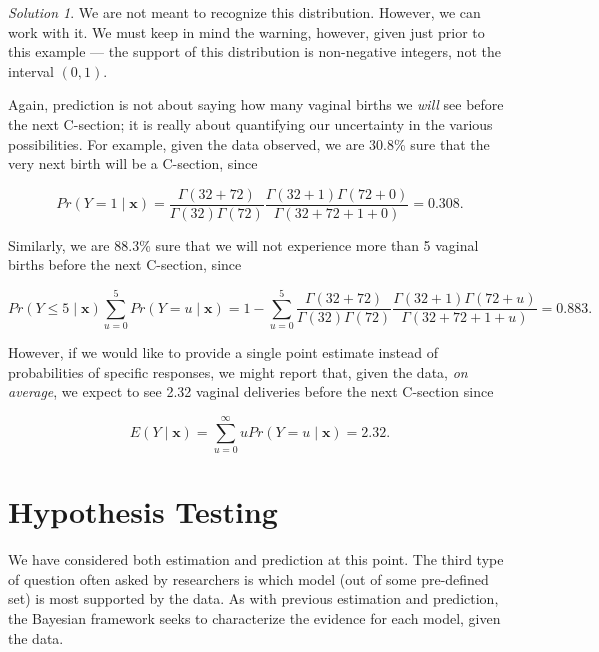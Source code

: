 \documentclass[
  letterpaper,
  DIV=11,
  numbers=noendperiod]{scrreprt}
\theoremstyle{definition}
\theoremstyle{definition}
\theoremstyle{plain}
\theoremstyle{remark}
\newtheorem*{solution}{Solution}
\begin{document}
\begin{solution}
We are not meant to recognize this distribution. However, we can work
with it. We must keep in mind the warning, however, given just prior to
this example --- the support of this distribution is non-negative
integers, not the interval \((0, 1)\).

Again, prediction is not about saying how many vaginal births we
\emph{will} see before the next C-section; it is really about
quantifying our uncertainty in the various possibilities. For example,
given the data observed, we are 30.8\% sure that the very next birth
will be a C-section, since

\[Pr(Y = 1 \mid \mathbf{x}) = \frac{\Gamma(32 + 72)}{\Gamma(32) \Gamma(72)} \frac{\Gamma(32 + 1) \Gamma(72 + 0)}{\Gamma(32 + 72 + 1 + 0)} = 0.308.\]

Similarly, we are 88.3\% sure that we will not experience more than 5
vaginal births before the next C-section, since

\[Pr(Y \leq 5 \mid \mathbf{x}) \sum_{u=0}^{5} Pr(Y = u \mid \mathbf{x}) = 1 - \sum_{u=0}^{5} \frac{\Gamma(32 + 72)}{\Gamma(32) \Gamma(72)} \frac{\Gamma(32 + 1) \Gamma(72 + u)}{\Gamma(32 + 72 + 1 + u)} = 0.883.\]

However, if we would like to provide a single point estimate instead of
probabilities of specific responses, we might report that, given the
data, \emph{on average}, we expect to see 2.32 vaginal deliveries before
the next C-section since

\[E\left(Y \mid \mathbf{x}\right) = \sum_{u=0}^{\infty} u Pr(Y = u \mid \mathbf{x}) = 2.32.\]

\end{solution}

\hypertarget{sec-hypothesis-testing}{%
\chapter{Hypothesis Testing}\label{sec-hypothesis-testing}}

\providecommand{\norm}[1]{\lVert#1\rVert}
\providecommand{\abs}[1]{\lvert#1\rvert}
\providecommand{\iid}{\stackrel{\text{IID}}{\sim}}
\providecommand{\ind}{\stackrel{\text{Ind}}{\sim}}

\providecommand{\bm}[1]{\mathbf{#1}}
\providecommand{\bs}[1]{\boldsymbol{#1}}
\providecommand{\bbeta}{\bs{\beta}}

\providecommand{\Ell}{\mathcal{L}}
\providecommand{\indep}{\perp\negthickspace\negmedspace\perp}

We have considered both estimation and prediction at this point. The
third type of question often asked by researchers is which model (out of
some pre-defined set) is most supported by the data. As with previous
estimation and prediction, the Bayesian framework seeks to characterize
the evidence for each model, given the data.
\end{document}
